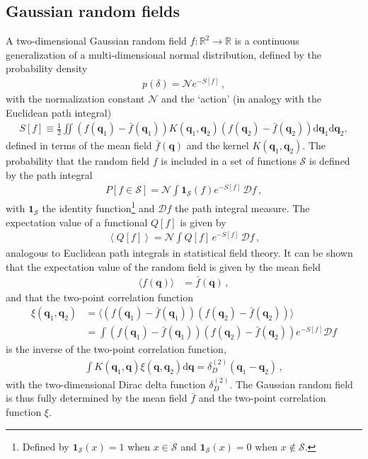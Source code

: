\documentclass[a4paper, 11pt]{article}
\begin{document}
\subsection{Gaussian random fields}
A two-dimensional Gaussian random field $f:\mathbb{R}^2\to \mathbb{R}$ is a continuous generalization of a multi-dimensional normal distribution, defined by the probability density
\begin{align}
p(\delta) = \mathcal{N} e^{- S[f]}\,, \label{eq:functional_Distribution}
\end{align}
with the normalization constant $\mathcal{N}$ and the `action' (in analogy with the Euclidean path integral)
\begin{align}
S[f]\equiv \frac{1}{2} \iint (f(\bm{q}_1) - \bar{f}(\bm{q}_1)) K(\bm{q}_1,\bm{q}_2) (f(\bm{q}_2) -\bar{f}(\bm{q}_2))\mathrm{d}\bm{q}_1 \mathrm{d}\bm{q}_2,\label{eq:action}
\end{align}
defined in terms of the mean field $\bar{f}(\bm{q})$ and the kernel $K(\bm{q}_1,\bm{q}_2)$. The probability that the random field $f$ is included in a set of functions $\mathcal{S}$ is defined by the path integral
\begin{align}
P[f \in \mathcal{S}] = \mathcal{N} \int \bm{1}_\mathcal{S}(f) e^{-S[f]}\,\mathcal{D}f\,,
\end{align}
with $\bm{1}_\mathcal{S}$ the identity function\footnote{Defined by $\bm{1}_\mathcal{S}(x)=1$ when $x \in \mathcal{S}$ and $\bm{1}_\mathcal{S}(x)=0$ when $x \notin \mathcal{S}$.} and $\mathcal{D}f$ the path integral measure. The expectation value of a functional $Q[f]$ is given by
\begin{align}
\left\langle Q[f] \right\rangle = \mathcal{N}\int Q[f]\, e^{-S[f]}\,\mathcal{D}f\,,
\end{align}
analogous to Euclidean path integrals in statistical field theory. It can be shown that the expectation value of the random field is given by the mean field
\begin{align}
\langle f(\bm{q})\rangle &= \bar{f}(\bm{q})\,,
\end{align}
and that the two-point correlation function
\begin{align}
\xi(\bm{q}_1, \bm{q}_2) &= \langle (f(\bm{q}_1) - \bar{f}(\bm{q}_1)) (f(\bm{q}_2) - \bar{f}(\bm{q}_2))\rangle\\
&= \int (f(\bm{q}_1) - \bar{f}(\bm{q}_1)) (f(\bm{q}_2) - \bar{f}(\bm{q}_2)) e^{-S[f]}\mathcal{D}f
\end{align}
is the inverse of the two-point correlation function,
\begin{align}
\int K(\bm{q}_1,\bm{q}) \xi(\bm{q},\bm{q}_2) \mathrm{d}\bm{q}= \delta_D^{(2)}(\bm{q}_1-\bm{q}_2)\,,\label{eq:defK}
\end{align}
with the two-dimensional Dirac delta function $\delta_D^{(2)}$. The Gaussian random field is thus fully determined by the mean field $\bar{f}$ and the two-point correlation function $\xi$. 
\end{document}
